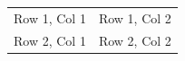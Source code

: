 \documentclass{article}
\begin{document}
\begin{center}
\begin{tabular}{ c c }
  Row 1, Col 1 & Row 1, Col 2 \\
  Row 2, Col 1 & Row 2, Col 2 \\
\end{tabular}
\end{center}
\end{document}
